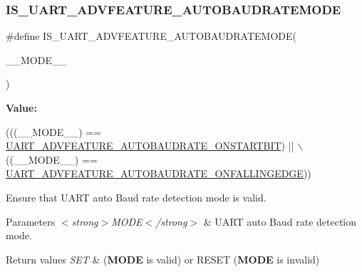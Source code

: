 \subsubsection{\texorpdfstring{I\+S\+\_\+\+U\+A\+R\+T\+\_\+\+A\+D\+V\+F\+E\+A\+T\+U\+R\+E\+\_\+\+A\+U\+T\+O\+B\+A\+U\+D\+R\+A\+T\+E\+M\+O\+DE}{IS\_UART\_ADVFEATURE\_AUTOBAUDRATEMODE}}
{\footnotesize\ttfamily \#define I\+S\+\_\+\+U\+A\+R\+T\+\_\+\+A\+D\+V\+F\+E\+A\+T\+U\+R\+E\+\_\+\+A\+U\+T\+O\+B\+A\+U\+D\+R\+A\+T\+E\+M\+O\+DE(\begin{DoxyParamCaption}\item[{}]{\+\_\+\+\_\+\+M\+O\+D\+E\+\_\+\+\_\+ }\end{DoxyParamCaption})}

{\bfseries Value\+:}
\begin{DoxyCode}
(((\_\_MODE\_\_) == \hyperlink{group___u_a_r_t_ex___auto_baud___rate___mode_ga87bcd5d6ca1b354785788366c9c47606}{UART\_ADVFEATURE\_AUTOBAUDRATE\_ONSTARTBIT})    || \(\backslash\)
                                                        ((\_\_MODE\_\_) == 
      \hyperlink{group___u_a_r_t_ex___auto_baud___rate___mode_ga8ac0407640f138067bdcf2ad6cdc04cc}{UART\_ADVFEATURE\_AUTOBAUDRATE\_ONFALLINGEDGE}))
\end{DoxyCode}


Ensure that U\+A\+RT auto Baud rate detection mode is valid. 


\begin{DoxyParams}{Parameters}
{\em $<$strong$>$\+M\+O\+D\+E$<$/strong$>$} & U\+A\+RT auto Baud rate detection mode. \\
\hline
\end{DoxyParams}

\begin{DoxyRetVals}{Return values}
{\em S\+ET} & ({\bfseries M\+O\+DE} is valid) or R\+E\+S\+ET ({\bfseries M\+O\+DE} is invalid) \\
\hline
\end{DoxyRetVals}
\mbox{\label{group___u_a_r_t_ex___private___macros_gae0055233b6372a290fe69c811d307c5e}} 
